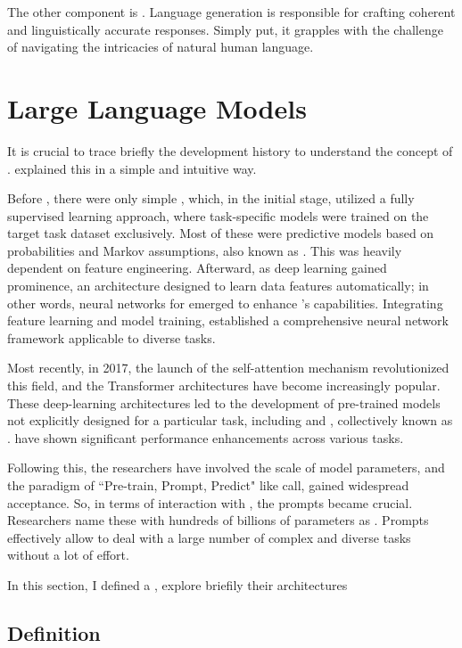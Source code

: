 The other component is \textbf{{\nlg}}. Language generation is responsible for crafting coherent and linguistically accurate responses. Simply put, it grapples with the challenge of navigating the intricacies of natural human language. 



\section{Large Language Models}


It is crucial to trace briefly the development history to understand the concept of {\llm}. \citet{liu_prompting_nodate} explained this in a simple and intuitive way.

Before {\llm}, there were only simple {\lm}, which, in the initial stage, utilized a fully supervised learning approach, where task-specific models were trained on the target task dataset exclusively. Most of these were predictive models based on probabilities and Markov assumptions, also known as {\slm}. This was heavily dependent on feature engineering. Afterward, as deep learning gained prominence, an architecture designed to learn data features automatically; in other words, neural networks for {\nlp} emerged to enhance {\lm}’s capabilities. Integrating feature learning and model training, {\nlm} established a comprehensive neural network framework applicable to diverse {\nlp} tasks.

Most recently, in 2017, the launch of the self-attention mechanism revolutionized this field, and the Transformer architectures have become increasingly popular. These deep-learning architectures led to the development of pre-trained models not explicitly designed for a particular task, including {\bert} and {\gpt}, collectively known as {\plm}. {\plm} have shown significant performance enhancements across various {\nlp} tasks.

Following this, the researchers have involved the scale of model parameters, and the paradigm of “Pre-train, Prompt, Predict" like \citet{liu_prompting_nodate} call, gained widespread acceptance. So, in terms of interaction with {\lm}, the prompts became crucial. Researchers name these {\plm} with hundreds of billions of parameters as  {\llm}. Prompts effectively allow {\llm} to deal with a large number of complex and diverse tasks without a lot of effort.

In this section, I defined a {\llm}, explore briefily their architectures 


\subsection{Definition}


